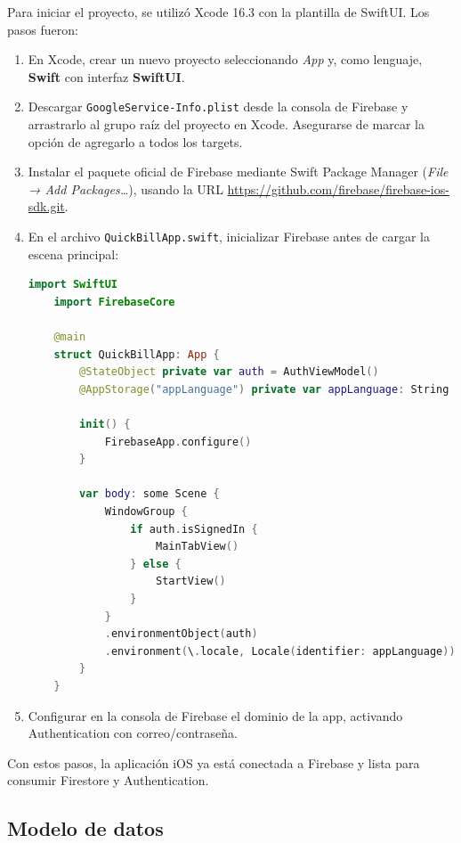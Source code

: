\begin{large}

Para iniciar el proyecto, se utilizó Xcode 16.3 con la plantilla de SwiftUI. Los pasos fueron:

\begin{enumerate}
  \item En Xcode, crear un nuevo proyecto seleccionando \emph{App} y, como lenguaje, \textbf{Swift} con interfaz \textbf{SwiftUI}.
  \item Descargar \texttt{GoogleService-Info.plist} desde la consola de Firebase y arrastrarlo al grupo raíz del proyecto en Xcode. Asegurarse de marcar la opción de agregarlo a todos los targets.
  \item Instalar el paquete oficial de Firebase mediante Swift Package Manager (\emph{File → Add Packages…}), usando la URL \url{https://github.com/firebase/firebase-ios-sdk.git}.
  \item En el archivo \texttt{QuickBillApp.swift}, inicializar Firebase antes de cargar la escena principal:
    \begin{lstlisting}[language={swift}, caption={Inicialización de Firebase en QuickBillApp.swift}]
    import SwiftUI
    import FirebaseCore
    
    @main
    struct QuickBillApp: App {
        @StateObject private var auth = AuthViewModel()
        @AppStorage("appLanguage") private var appLanguage: String = AppLanguage.english.rawValue
        
        init() {
            FirebaseApp.configure()
        }
        
        var body: some Scene {
            WindowGroup {
                if auth.isSignedIn {
                    MainTabView()
                } else {
                    StartView()
                }
            }
            .environmentObject(auth)
            .environment(\.locale, Locale(identifier: appLanguage))
        }
    }
    \end{lstlisting}
  \item Configurar en la consola de Firebase el dominio de la app, activando Authentication con correo/contraseña.
\end{enumerate}

Con estos pasos, la aplicación iOS ya está conectada a Firebase y lista para consumir Firestore y Authentication.

\end{large}

\subsection{Modelo de datos}

